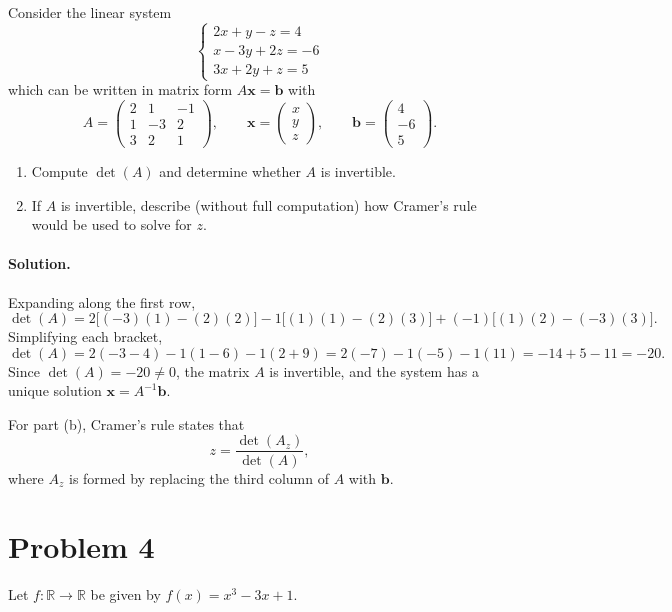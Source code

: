 \documentclass[11pt]{article}
\newcommand{\R}{\mathbb{R}}
\begin{document}
Consider the linear system
\[
  \begin{cases}
    2x + y - z = 4 \\
    x - 3y + 2z = -6 \\
    3x + 2y + z = 5
  \end{cases}
\]
which can be written in matrix form $A\mathbf{x} = \mathbf{b}$ with
\[
  A = \begin{pmatrix} 2 & 1 & -1 \\ 1 & -3 & 2 \\ 3 & 2 & 1 \end{pmatrix}, \qquad
  \mathbf{x} = \begin{pmatrix} x \\ y \\ z \end{pmatrix}, \qquad
  \mathbf{b} = \begin{pmatrix} 4 \\ -6 \\ 5 \end{pmatrix}.
\]

\begin{enumerate}[label=(\alph*)]
  \item Compute $\det(A)$ and determine whether $A$ is invertible.
  \item If $A$ is invertible, describe (without full computation) how Cramer's rule would
        be used to solve for $z$.
\end{enumerate}

\paragraph{Solution.} Expanding along the first row,
\[
  \det(A) = 2\bigl[(-3)(1) - (2)(2)\bigr] - 1\bigl[(1)(1) - (2)(3)\bigr]
             + (-1)\bigl[(1)(2) - (-3)(3)\bigr].
\]
Simplifying each bracket,
\[
  \det(A) = 2(-3-4) - 1(1-6) - 1(2+9) = 2(-7) - 1(-5) - 1(11) = -14 + 5 - 11 = -20.
\]
Since $\det(A) = -20 \neq 0$, the matrix $A$ is invertible, and the system has a unique
solution $\mathbf{x} = A^{-1}\mathbf{b}$.

For part (b), Cramer's rule states that
\[
  z = \frac{\det(A_z)}{\det(A)},
\]
where $A_z$ is formed by replacing the third column of $A$ with $\mathbf{b}$.

\section*{Problem 4}

Let $f : \R \to \R$ be given by $f(x) = x^3 - 3x + 1$.
\end{document}
